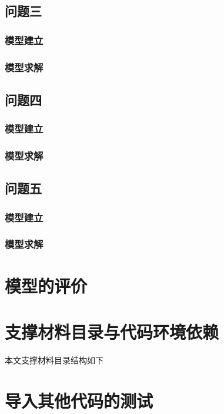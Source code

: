 \documentclass{../../../Template/cumcmthesis} %
\begin{document}
\subsection{问题三}
  \subsubsection{模型建立}
    
  \subsubsection{模型求解}
    
    \subsection{问题四}
    \subsubsection{模型建立}
    
    \subsubsection{模型求解}
    
    \subsection{问题五}
    \subsubsection{模型建立}
    
    \subsubsection{模型求解}
    
     
\section{模型的评价}
  


\newpage
\nocite{*}



\newpage
\begin{appendices} %
  \section{支撑材料目录与代码环境依赖}
    本文支撑材料目录结构如下
    

  \section{导入其他代码的测试}
  

\end{appendices}
\end{document}
